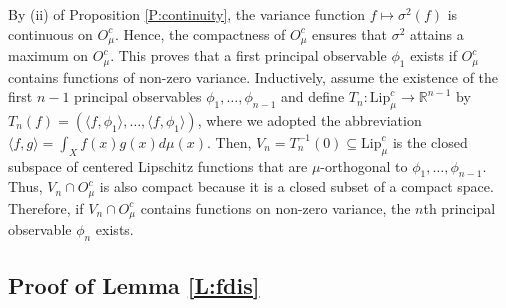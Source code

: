 \documentclass[11pt]{article}
\theoremstyle{definition}
\newcommand{\real}{\ensuremath{\mathbb{R}}}
\newcommand{\lip}{\ensuremath{\text{Lip}}}
\newcommand{\cobs}[1]{\ensuremath{O^c_{#1}}}
\begin{document}
By (ii) of Proposition \ref{P:continuity}, the variance function $f \mapsto \sigma^2(f)$ is continuous on $\cobs{\mu}$. Hence, the compactness of $\cobs{\mu}$ ensures that $\sigma^2$ attains a maximum on $\cobs{\mu}$. This proves that a first principal observable $\phi_1$ exists if $\cobs{\mu}$ contains functions of non-zero variance. Inductively, assume the existence of the first $n-1$ principal observables  $\phi_1, \ldots, \phi_{n-1}$ and define $T_n \colon \lip_\mu^c\to \real^{n-1}$ by $T_n (f) = (\langle f,\phi_1\rangle, \ldots, \langle f,\phi_1\rangle)$, where we adopted the abbreviation $\langle f,g \rangle = \int_X f(x)g(x) d\mu (x)$. Then, $V_n = T_n^{-1} (0) \subseteq \lip_\mu^c$ is the closed subspace of centered Lipschitz functions that are $\mu$-orthogonal to $\phi_1, \ldots, \phi_{n-1}$. Thus, $V_n \cap \cobs{\mu}$ is also compact because it is a closed subset of a compact space. Therefore, if $V_n \cap \cobs{\mu}$ contains functions on non-zero variance, the $n$th principal observable $\phi_n$ exists.

\subsection{Proof of Lemma \ref{L:fdis}} \label{A:fdis}
\end{document}
